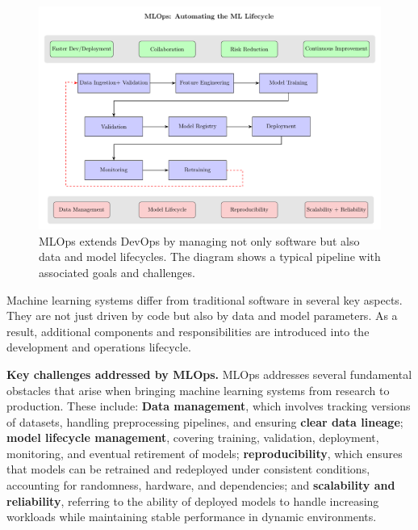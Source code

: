 \begin{figure}[ht]
  \centering
  \includegraphics[width=\textwidth]{images/mlops_pipeline.pdf}
  \caption{MLOps extends DevOps by managing not only software but also data and model lifecycles. The diagram shows a typical pipeline with associated goals and challenges.}
  \label{fig:mlops-pipeline}
\end{figure}


Machine learning systems differ from traditional software in several key aspects. They are not just driven by code but also by data and model parameters. As a result, additional components and responsibilities are introduced into the development and operations lifecycle.

{\bf Key challenges addressed by MLOps.} MLOps addresses several fundamental obstacles that arise when bringing machine learning systems from research to production. These include:
{\bf Data management}, which involves tracking versions of datasets, handling preprocessing pipelines, and ensuring \textbf{clear data lineage};
{\bf model lifecycle management}, covering training, validation, deployment, monitoring, and eventual retirement of models; 
{\bf reproducibility}, which ensures that models can be retrained and redeployed under consistent conditions, accounting for randomness, hardware, and dependencies; and 
{\bf scalability and reliability}, referring to the ability of deployed models to handle increasing workloads while maintaining stable performance in dynamic environments.

